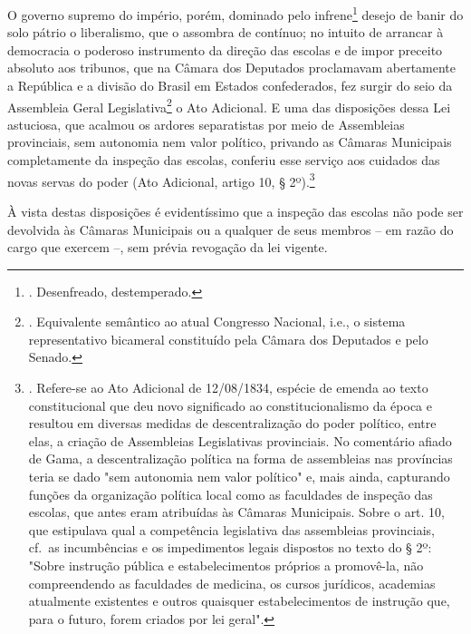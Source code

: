 O governo supremo do império, porém, dominado pelo infrene\footnote{.
  Desenfreado, destemperado.} desejo de banir do solo pátrio o
liberalismo, que o assombra de contínuo; no intuito de arrancar à
democracia o poderoso instrumento da direção das escolas e de impor
preceito absoluto aos tribunos, que na Câmara dos Deputados proclamavam
abertamente a República e a divisão do Brasil em Estados confederados,
fez surgir do seio da Assembleia Geral Legislativa\footnote{.
  Equivalente semântico ao atual Congresso Nacional, i.e., o sistema
  representativo bicameral constituído pela Câmara dos Deputados e pelo
  Senado.} o Ato Adicional. E uma das disposições dessa Lei astuciosa,
que acalmou os ardores separatistas por meio de Assembleias provinciais,
sem autonomia nem valor político, privando as Câmaras Municipais
completamente da inspeção das escolas, conferiu esse serviço aos
cuidados das novas servas do poder (Ato Adicional, artigo 10, §
2º).\footnote{. Refere-se ao Ato Adicional de 12/08/1834, espécie de
  emenda ao texto constitucional que deu novo significado ao
  constitucionalismo da época e resultou em diversas medidas de
  descentralização do poder político, entre elas, a criação de
  Assembleias Legislativas provinciais. No comentário afiado de Gama, a
  descentralização política na forma de assembleias nas províncias teria
  se dado "sem autonomia nem valor político" e, mais ainda, capturando
  funções da organização política local como as faculdades de inspeção
  das escolas, que antes eram atribuídas às Câmaras Municipais. Sobre o
  art. 10, que estipulava qual a competência legislativa das assembleias
  provinciais, cf.~as incumbências e os impedimentos legais dispostos no
  texto do § 2º: "Sobre instrução pública e estabelecimentos próprios a
  promovê-la, não compreendendo as faculdades de medicina, os cursos
  jurídicos, academias atualmente existentes e outros quaisquer
  estabelecimentos de instrução que, para o futuro, forem criados por
  lei geral".}

À vista destas disposições é evidentíssimo que a inspeção das escolas
não pode ser devolvida às Câmaras Municipais ou a qualquer de seus
membros -- em razão do cargo que exercem --, sem prévia revogação da lei
vigente.

